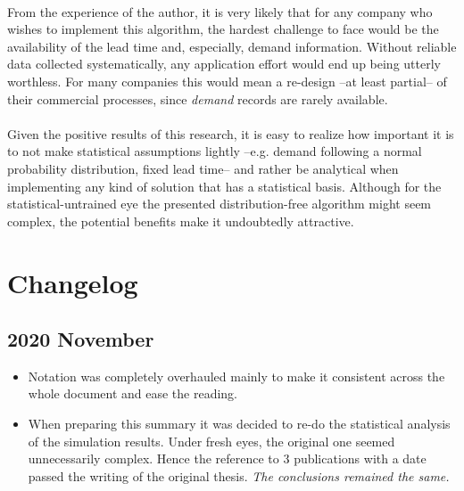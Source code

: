 \documentclass[letterpaper]{article}
\begin{document}
 \paragraph{}
 From the experience of the author, it is very likely that for any company who wishes to implement this algorithm, the hardest challenge to face would be the availability of the lead time and, especially, demand information. Without reliable data collected systematically, any application effort would end up being utterly worthless. For many companies this would mean a re-design --at least partial-- of their commercial processes, since \textit{demand} records are rarely available.
 
\paragraph{}
Given the positive results of this research, it is easy to realize how important it is to not make statistical assumptions lightly --e.g. demand following a normal probability distribution, fixed lead time-- and rather be analytical when implementing any kind of solution that has a statistical basis. Although for the statistical-untrained eye the presented distribution-free algorithm might seem complex, the potential benefits make it undoubtedly attractive.



\section*{Changelog}
\subsection*{2020 November}
\begin{itemize}
    \item Notation was completely overhauled mainly to make it consistent across the whole document and ease the reading.
    \item When preparing this summary it was decided to re-do the statistical analysis of the simulation results. Under fresh eyes, the original one seemed unnecessarily complex. Hence the reference to 3 publications with a date passed the writing of the original thesis. \textit{The conclusions remained the same.}
    
\end{itemize}
\end{document}
